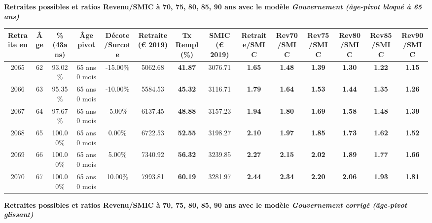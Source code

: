 {\bf \noindent Retraites possibles et ratios Revenu/SMIC à 70, 75, 80, 85, 90 ans avec le modèle \emph{Gouvernement (âge-pivot bloqué à 65 ans)}}  
 
\begin{adjustbox}{max width=\textwidth} 
\begin{tabular}[htb]{|c|c||c|c|c||c|c||c||c|c|c|c|c|c|} 
\hline 
 Retraite en &  Âge &  \%(43ans) &  Âge pivot &  Décote/Surcote &  Retraite (\euro{} 2019) &  Tx Rempl(\%) &  SMIC (\euro{} 2019) &  Retraite/SMIC &  Rev70/SMIC &  Rev75/SMIC &  Rev80/SMIC &  Rev85/SMIC &  Rev90/SMIC \\ 
\hline \hline 
 2065 &  62 &  93.02\% &  65 ans 0 mois &  -15.00\% &  5062.68 &  {\bf 41.87} &  3076.71 &  {\bf 1.65} &  {\bf 1.48} &  {\bf 1.39} &  {\bf 1.30} &  {\bf 1.22} &  {\bf 1.15} \\ 
\hline 
 2066 &  63 &  95.35\% &  65 ans 0 mois &  -10.00\% &  5584.53 &  {\bf 45.32} &  3116.71 &  {\bf 1.79} &  {\bf 1.64} &  {\bf 1.53} &  {\bf 1.44} &  {\bf 1.35} &  {\bf 1.26} \\ 
\hline 
 2067 &  64 &  97.67\% &  65 ans 0 mois &  -5.00\% &  6137.45 &  {\bf 48.88} &  3157.23 &  {\bf 1.94} &  {\bf 1.80} &  {\bf 1.69} &  {\bf 1.58} &  {\bf 1.48} &  {\bf 1.39} \\ 
\hline 
 2068 &  65 &  100.00\% &  65 ans 0 mois &  0.00\% &  6722.53 &  {\bf 52.55} &  3198.27 &  {\bf 2.10} &  {\bf 1.97} &  {\bf 1.85} &  {\bf 1.73} &  {\bf 1.62} &  {\bf 1.52} \\ 
\hline 
 2069 &  66 &  100.00\% &  65 ans 0 mois &  5.00\% &  7340.92 &  {\bf 56.32} &  3239.85 &  {\bf 2.27} &  {\bf 2.15} &  {\bf 2.02} &  {\bf 1.89} &  {\bf 1.77} &  {\bf 1.66} \\ 
\hline 
 2070 &  67 &  100.00\% &  65 ans 0 mois &  10.00\% &  7993.81 &  {\bf 60.19} &  3281.97 &  {\bf 2.44} &  {\bf 2.34} &  {\bf 2.20} &  {\bf 2.06} &  {\bf 1.93} &  {\bf 1.81} \\ 
\hline 
\hline 
\end{tabular} 
\end{adjustbox} 
 
 \vspace{0.1cm} 
{\bf \noindent Retraites possibles et ratios Revenu/SMIC à 70, 75, 80, 85, 90 ans avec le modèle \emph{Gouvernement corrigé (âge-pivot glissant)}}  
 

